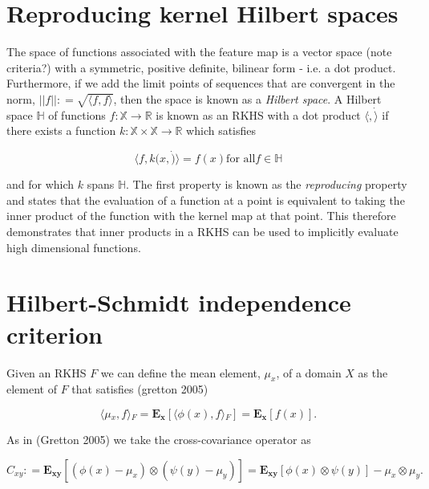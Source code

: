 \section{Reproducing kernel Hilbert spaces}

The space of functions associated with the feature map is a vector space (note criteria?) with a symmetric, positive definite, bilinear form - i.e. a dot product. Furthermore, if we add the limit points of sequences that are convergent in the norm, $||f|| \colon= \sqrt{\langle f, f \rangle}$, then the space is known as a \textit{Hilbert space}. A Hilbert space $\mathbb{H}$ of functions $f \colon \mathbb{X} \rightarrow \mathbb{R}$ is known as an RKHS with a dot product $\langle \dot, \dot \rangle$ if there exists a function $k \colon \mathbb{X} \times \mathbb{X} \rightarrow \mathbb{R}$ which satisfies

\begin{equation}
\langle f, k(x,\dot) \rangle = f(x) \text{for all} f \in \mathbb{H}
\end{equation}

\noindent and for which $k$ spans $\mathbb{H}$. \noindent The first property is known as the \textit{reproducing} property and states that the evaluation of a function at a point is equivalent to taking the inner product of the function with the kernel map at that point. This therefore demonstrates that inner products in a RKHS can be used to implicitly evaluate high dimensional functions. \\



\section{Hilbert-Schmidt independence criterion}


Given an RKHS $F$ we can define the mean element, $\mu_x$, of a domain $X$ as the element of $F$ that satisfies (gretton 2005)

\begin{equation}
\langle \mu{_x}, f \rangle{_F} = \mathbf{E_x}[\langle \phi(x), f \rangle{_F} ] = \mathbf{E_x}[f(x)].
\end{equation} 

\noindent As in (Gretton 2005) we take the cross-covariance operator as 

\begin{equation}
C_{xy} \colon= \mathbf{E_{xy}}[(\phi(x) - \mu_x) \otimes (\psi(y) - \mu_y)] = \mathbf{E_{xy}}[\phi(x) \otimes \psi(y)] - \mu_x \otimes \mu_y.
\end{equation}

